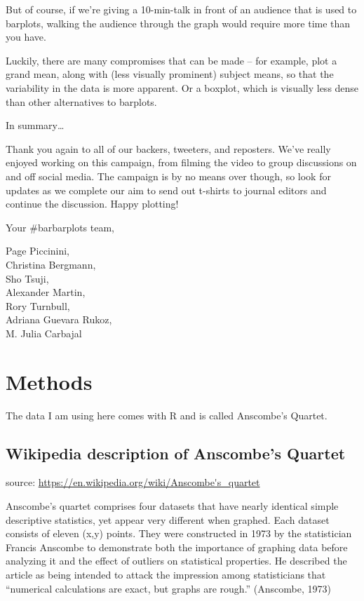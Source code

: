 \documentclass[english,floatsintext,man]{apa6}
\begin{document}
But of course, if we're giving a 10-min-talk in front of an audience
that is used to barplots, walking the audience through the graph would
require more time than you have.

Luckily, there are many compromises that can be made -- for example,
plot a grand mean, along with (less visually prominent) subject means,
so that the variability in the data is more apparent. Or a boxplot,
which is visually less dense than other alternatives to barplots.

In summary\ldots{}

Thank you again to all of our backers, tweeters, and reposters. We've
really enjoyed working on this campaign, from filming the video to group
discussions on and off social media. The campaign is by no means over
though, so look for updates as we complete our aim to send out t-shirts
to journal editors and continue the discussion. Happy plotting!

Your \#barbarplots team,

Page Piccinini,\\
Christina Bergmann,\\
Sho Tsuji,\\
Alexander Martin,\\
Rory Turnbull,\\
Adriana Guevara Rukoz,\\
M. Julia Carbajal

\section{Methods}\label{methods}

The data I am using here comes with R and is called Anscombe's Quartet.

\subsection{Wikipedia description of Anscombe's
Quartet}\label{wikipedia-description-of-anscombes-quartet}

source: \url{https://en.wikipedia.org/wiki/Anscombe's_quartet}

Anscombe's quartet comprises four datasets that have nearly identical
simple descriptive statistics, yet appear very different when graphed.
Each dataset consists of eleven (x,y) points. They were constructed in
1973 by the statistician Francis Anscombe to demonstrate both the
importance of graphing data before analyzing it and the effect of
outliers on statistical properties. He described the article as being
intended to attack the impression among statisticians that
\enquote{numerical calculations are exact, but graphs are rough.}
(Anscombe, 1973)
\end{document}
